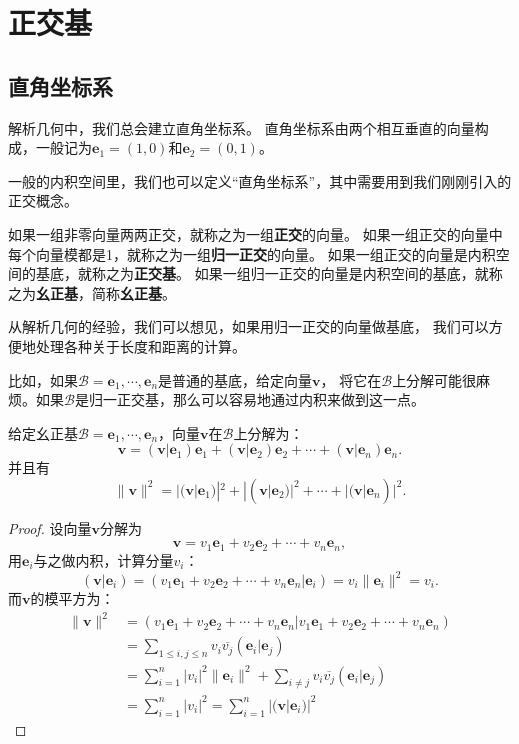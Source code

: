 \documentclass[12pt,UTF8]{ctexbook}
\begin{document}
\section{正交基}
\subsection{直角坐标系}
解析几何中，我们总会建立直角坐标系。
直角坐标系由两个相互垂直的向量构成，一般记为$\mathbf{e}_1 = (1,0)$和$\mathbf{e}_2 = (0,1)$。

一般的内积空间里，我们也可以定义“直角坐标系”，其中需要用到我们刚刚引入的正交概念。

如果一组非零向量两两正交，就称之为一组\textbf{正交}的向量。
如果一组正交的向量中每个向量模都是1，就称之为一组\textbf{归一正交}的向量。
如果一组正交的向量是内积空间的基底，就称之为\textbf{正交基}。
如果一组归一正交的向量是内积空间的基底，就称之为\textbf{幺正基}，简称\textbf{幺正基}。

从解析几何的经验，我们可以想见，如果用归一正交的向量做基底，
我们可以方便地处理各种关于长度和距离的计算。

比如，如果$\mathcal{B} = \mathbf{e}_1, \cdots , \mathbf{e}_n$是普通的基底，给定向量$\mathbf{v}$，
将它在$\mathcal{B}$上分解可能很麻烦。如果$\mathcal{B}$是归一正交基，那么可以容易地通过内积来做到这一点。

\begin{pp}\label{pp:7_3}
    给定幺正基$\mathcal{B} = \mathbf{e}_1, \cdots , \mathbf{e}_n$，向量$\mathbf{v}$在$\mathcal{B}$上分解为：
    $$\mathbf{v} = (\mathbf{v}|\mathbf{e}_1)\mathbf{e}_1 + (\mathbf{v}|\mathbf{e}_2)\mathbf{e}_2 + \cdots + (\mathbf{v}|\mathbf{e}_n)\mathbf{e}_n.$$
    并且有
    $$\|\mathbf{v}\|^2 = |(\mathbf{v}|\mathbf{e}_1)|^2 + |(\mathbf{v}|\mathbf{e}_2)|^2 + \cdots + |(\mathbf{v}|\mathbf{e}_n)|^2.$$
\end{pp}

\begin{proof} %
    设向量$\mathbf{v}$分解为
    $$ \mathbf{v} = v_1\mathbf{e}_1 + v_2\mathbf{e}_2 + \cdots + v_n \mathbf{e}_n, $$
    用$\mathbf{e}_i$与之做内积，计算分量$v_i$：
    $$ (\mathbf{v} | \mathbf{e}_i) = (v_1\mathbf{e}_1 + v_2\mathbf{e}_2 + \cdots + v_n \mathbf{e}_n | \mathbf{e}_i) = v_i \|\mathbf{e}_i\|^2 = v_i. $$
    而$\mathbf{v}$的模平方为：
    \begin{align*}
        \|\mathbf{v}\|^2 &=  (v_1\mathbf{e}_1 + v_2\mathbf{e}_2 + \cdots + v_n \mathbf{e}_n |v_1\mathbf{e}_1 + v_2\mathbf{e}_2 + \cdots + v_n \mathbf{e}_n)  \\
        &= \sum_{1 \leqslant i, j \leqslant n} v_i \overline{v_j} (\mathbf{e}_i | \mathbf{e}_j)  \\
        &= \sum_{i=1}^n | v_i|^2 \|\mathbf{e}_i \|^2 + \sum_{i \neq j} v_i \overline{v_j} (\mathbf{e}_i | \mathbf{e}_j)  \\
        &= \sum_{i=1}^n | v_i|^2 = \sum_{i=1}^n |(\mathbf{v} | \mathbf{e}_i)|^2 
    \end{align*}
\end{proof}
\end{document}
